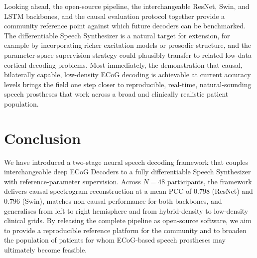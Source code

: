 \documentclass[11pt]{article}
\begin{document}
Looking ahead, the open-source pipeline, the interchangeable ResNet,
Swin, and LSTM backbones, and the causal evaluation protocol together
provide a community reference point against which future decoders can be
benchmarked. The differentiable Speech Synthesizer is a natural target
for extension, for example by incorporating richer excitation models or
prosodic structure, and the parameter-space supervision strategy could
plausibly transfer to related low-data cortical decoding problems. Most
immediately, the demonstration that causal, bilaterally capable,
low-density ECoG decoding is achievable at current accuracy levels brings
the field one step closer to reproducible, real-time, natural-sounding
speech prostheses that work across a broad and clinically realistic
patient population.

\section{Conclusion}

We have introduced a two-stage neural speech decoding framework that
couples interchangeable deep ECoG Decoders to a fully differentiable
Speech Synthesizer with reference-parameter supervision. Across $N=48$
participants, the framework delivers causal spectrogram reconstruction at
a mean PCC of $0.798$ (ResNet) and $0.796$ (Swin), matches non-causal
performance for both backbones, and generalises from left to right
hemisphere and from hybrid-density to low-density clinical grids. By
releasing the complete pipeline as open-source software, we aim to
provide a reproducible reference platform for the community and to
broaden the population of patients for whom ECoG-based speech prostheses
may ultimately become feasible.



\end{document}
